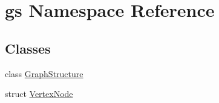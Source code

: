 \hypertarget{namespacegs}{}\section{gs Namespace Reference}
\label{namespacegs}
\subsection*{Classes}
\begin{DoxyCompactItemize}
\item 
class \mbox{\hyperlink{classgs_1_1_graph_structure}{Graph\+Structure}}
\item 
struct \mbox{\hyperlink{structgs_1_1_vertex_node}{Vertex\+Node}}
\end{DoxyCompactItemize}
